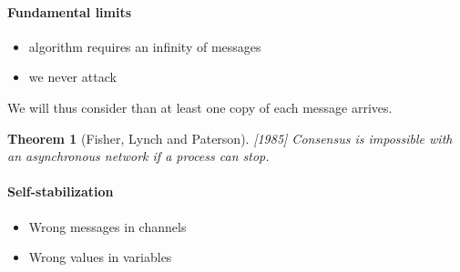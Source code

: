 \documentclass{article}
\newtheorem{thm}{Theorem}
\begin{document}
\paragraph{Fundamental limits}
\begin{itemize}[noitemsep]
\item algorithm requires an infinity of messages
\item we never attack
\end{itemize}

We will thus consider than at least one copy of each message arrives.

\begin{thm}[Fisher, Lynch and Paterson][1985]
	Consensus is impossible with an asynchronous network if a process can stop.
\end{thm}



\paragraph{Self-stabilization}
\begin{itemize}[noitemsep]
\item Wrong messages in channels
\item Wrong values in variables
\end{itemize}
\end{document}
